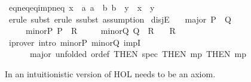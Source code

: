 \begin{isabellebody}
\endisatagproof
{\isafoldproof}%
%
\isadelimproof
\isanewline
%
\endisadelimproof
\isanewline
{}\isamarkupfalse%
\ eq{\isacharunderscore}{\kern0pt}neq{\isacharunderscore}{\kern0pt}eq{\isacharunderscore}{\kern0pt}imp{\isacharunderscore}{\kern0pt}neq{\isacharcolon}{\kern0pt}\ {\isachardoublequoteopen}{\isasymlbrakk}x\ {\isacharequal}{\kern0pt}\ a{\isacharsemicolon}{\kern0pt}\ a\ {\isasymnoteq}\ b{\isacharsemicolon}{\kern0pt}\ b\ {\isacharequal}{\kern0pt}\ y{\isasymrbrakk}\ {\isasymLongrightarrow}\ x\ {\isasymnoteq}\ y{\isachardoublequoteclose}\isanewline
%
\isadelimproof
\ \ %
\endisadelimproof
%
\isatagproof
{}\isamarkupfalse%
\ {\isacharparenleft}{\kern0pt}erule\ subst{\isacharcomma}{\kern0pt}\ erule\ ssubst{\isacharcomma}{\kern0pt}\ assumption{\isacharparenright}{\kern0pt}%
\endisatagproof
{\isafoldproof}%
%
\isadelimproof
%
\endisadelimproof
%
\isadelimdocument
%
\endisadelimdocument
%
\isatagdocument
%
\isamarkuptrue%
%
\endisatagdocument
{\isafolddocument}%
%
\isadelimdocument
%
\endisadelimdocument
{}\isamarkupfalse%
\ disjE{\isacharcolon}{\kern0pt}\isanewline
\ \ \ major{\isacharcolon}{\kern0pt}\ {\isachardoublequoteopen}P\ {\isasymor}\ Q{\isachardoublequoteclose}\isanewline
\ \ \ \ \ minorP{\isacharcolon}{\kern0pt}\ {\isachardoublequoteopen}P\ {\isasymLongrightarrow}\ R{\isachardoublequoteclose}\isanewline
\ \ \ \ \ minorQ{\isacharcolon}{\kern0pt}\ {\isachardoublequoteopen}Q\ {\isasymLongrightarrow}\ R{\isachardoublequoteclose}\isanewline
\ \ \ R\isanewline
%
\isadelimproof
\ \ %
\endisadelimproof
%
\isatagproof
{}\isamarkupfalse%
\ {\isacharparenleft}{\kern0pt}iprover\ intro{\isacharcolon}{\kern0pt}\ minorP\ minorQ\ impI\isanewline
\ \ \ \ \ \ major\ {\isacharbrackleft}{\kern0pt}unfolded\ or{\isacharunderscore}{\kern0pt}def{\isacharcomma}{\kern0pt}\ THEN\ spec{\isacharcomma}{\kern0pt}\ THEN\ mp{\isacharcomma}{\kern0pt}\ THEN\ mp{\isacharbrackright}{\kern0pt}{\isacharparenright}{\kern0pt}%
\endisatagproof
{\isafoldproof}%
%
\isadelimproof
%
\endisadelimproof
%
\isadelimdocument
%
\endisadelimdocument
%
\isatagdocument
%
\isamarkuptrue%
%
\endisatagdocument
{\isafolddocument}%
%
\isadelimdocument
%
\endisadelimdocument
%
\begin{isamarkuptext}%
In an intuitionistic version of HOL  needs to be an axiom.%
\end{isamarkuptext}\isamarkuptrue%
\isamarkupfalse%

\end{isabellebody}
